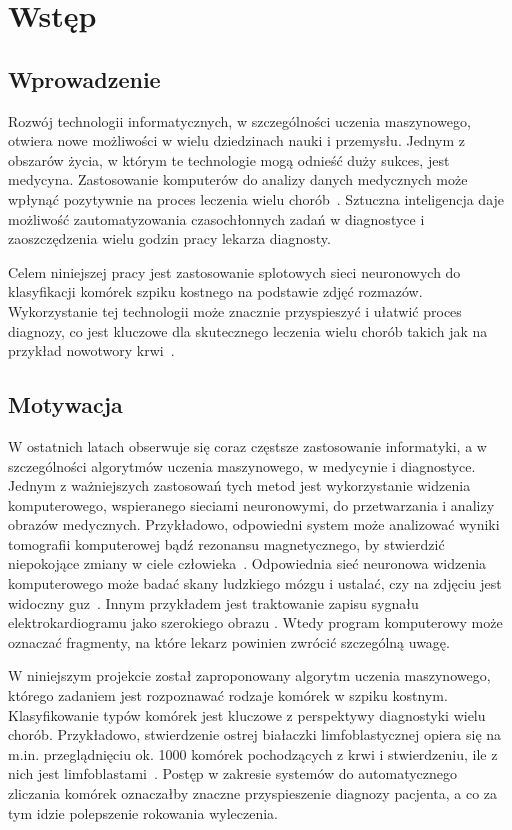 \chapter{Wstęp}


\section{Wprowadzenie}

Rozwój technologii informatycznych, w szczególności uczenia maszynowego, otwiera nowe możliwości w wielu dziedzinach nauki i przemysłu.
Jednym z obszarów życia, w którym te technologie mogą odnieść duży sukces, jest medycyna.
Zastosowanie komputerów do analizy danych medycznych może wpłynąć pozytywnie na proces leczenia wielu chorób~\cite{machine_learning_in_medicine}.
Sztuczna inteligencja daje możliwość zautomatyzowania czasochłonnych zadań w diagnostyce i zaoszczędzenia wielu godzin pracy lekarza diagnosty.

Celem niniejszej pracy jest zastosowanie splotowych sieci neuronowych do klasyfikacji komórek szpiku kostnego na podstawie zdjęć rozmazów.
Wykorzystanie tej technologii może znacznie przyspieszyć i ułatwić proces diagnozy, co jest kluczowe dla skutecznego leczenia wielu chorób takich jak na przykład nowotwory krwi~\cite{machine_learning_cancer}.


\section{Motywacja}

W ostatnich latach obserwuje się coraz częstsze zastosowanie informatyki, a w szczególności algorytmów uczenia maszynowego,
w medycynie i diagnostyce.
Jednym z ważniejszych zastosowań tych metod jest wykorzystanie widzenia komputerowego, wspieranego sieciami neuronowymi, do przetwarzania i analizy obrazów medycznych.
Przykładowo, odpowiedni system może analizować wyniki tomografii komputerowej bądź rezonansu magnetycznego, by stwierdzić niepokojące zmiany w ciele człowieka~\cite{mri}.
Odpowiednia sieć neuronowa widzenia komputerowego może badać skany ludzkiego mózgu i ustalać, czy na zdjęciu jest widoczny guz~\cite{brain_tumor}.
Innym przykładem jest traktowanie zapisu sygnału elektrokardiogramu jako szerokiego
obrazu \cite{ecg_cnn}.
Wtedy program komputerowy może oznaczać fragmenty, na które lekarz powinien zwrócić szczególną uwagę.

W niniejszym projekcie został zaproponowany algorytm uczenia maszynowego, którego zadaniem jest rozpoznawać rodzaje komórek w szpiku kostnym.
Klasyfikowanie typów komórek jest kluczowe z perspektywy diagnostyki wielu chorób.
Przykładowo, stwierdzenie ostrej białaczki limfoblastycznej opiera się na m.in.
przeglądnięciu ok. 1000 komórek pochodzących z krwi i stwierdzeniu, ile z nich jest limfoblastami~\cite{blast_counting_diagnosis}.
Postęp w zakresie systemów do automatycznego zliczania komórek oznaczałby znaczne przyspieszenie diagnozy pacjenta, a co za tym idzie polepszenie rokowania wyleczenia.

